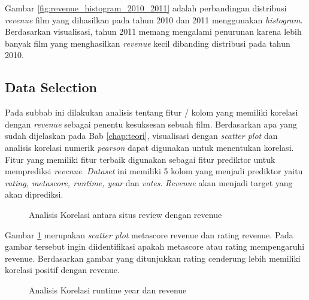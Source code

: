 Gambar \ref{fig:revenue_histogram_2010_2011} adalah perbandingan distribusi \textit{revenue} film yang dihasilkan pada tahun 2010 dan 2011 menggunakan \textit{histogram}. Berdasarkan visualisasi, tahun 2011 memang mengalami penurunan karena lebih banyak film yang menghasilkan \textit{revenue} kecil dibanding distribusi pada tahun 2010. 



\subsection{Data Selection}
\label{chap:hasildataselection}
Pada subbab ini dilakukan analisis tentang fitur / kolom yang memiliki korelasi dengan \textit{revenue} sebagai penentu kesuksesan sebuah film. Berdasarkan apa yang sudah dijelaskan pada Bab \ref{chap:teori}, visualisasi dengan \textit{scatter plot} dan analisis korelasi numerik \textit{pearson} dapat digunakan untuk menentukan korelasi. Fitur yang memiliki fitur terbaik digunakan sebagai fitur prediktor untuk memprediksi \textit{revenue}. \textit{Dataset} ini memiliki 5 kolom yang menjadi prediktor yaitu \textit{rating, metascore, runtime, year} dan \textit{votes}.  \textit{Revenue} akan menjadi target yang akan diprediksi.

\begin{figure}[H]
    \centering
    \qquad
    \caption{Analisis Korelasi antara situs review dengan revenue}%
    \label{fig:metascore_rating_revenue_scatterplot}%
\end{figure}


Gambar \ref{fig:metascore_rating_revenue_scatterplot} merupakan \textit{scatter plot} metascore revenue dan rating revenue. Pada gambar tersebut ingin diidentifikasi apakah metascore atau rating mempengaruhi revenue. Berdasarkan gambar yang ditunjukkan rating cenderung lebih memiliki korelasi positif dengan revenue.


\begin{figure}[H]
    \centering
    \qquad
    \caption{Analisis Korelasi runtime year dan  revenue}%
    \label{fig:year_runtime_revenue_scatterplot}%
\end{figure}

